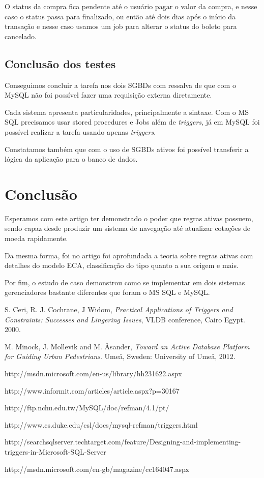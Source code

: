 \documentclass[conference]{IEEEtran}
\begin{document}
    O status da compra fica pendente até o usuário pagar o valor da compra, e nesse caso o status passa para finalizado, ou então até dois dias após o início da transação e nesse caso usamos um job para alterar o status do boleto para cancelado.

  \subsection{Conclusão dos testes}
  Conseguimos concluir a tarefa nos dois SGBDs com ressalva de que com o MySQL não foi possível fazer uma requisição externa diretamente.

	Cada sistema apresenta particularidades, principalmente a sintaxe. Com o MS SQL precisamos usar stored procedures e Jobs além de \textit{triggers}, já em MySQL foi possível realizar a tarefa usando apenas \textit{triggers}.

	Constatamos também que com o uso de SGBDs ativos foi possível transferir a lógica da aplicação para o banco de dados.

\section{Conclusão}
Esperamos com este artigo ter demonstrado o poder que regras ativas possuem, sendo capaz desde produzir um sistema de navegação até atualizar cotações de moeda rapidamente.

Da mesma forma, foi no artigo foi aprofundada a teoria sobre regras ativas com detalhes do modelo ECA, classificação do tipo quanto a sua origem e mais.

Por fim, o estudo de caso demonstrou como se implementar em dois sistemas gerenciadores bastante diferentes que foram o MS SQL e MySQL.

\begin{thebibliography}{1}

  S. Ceri, R. J. Cochrane, J Widom, \textit{Practical Applications of Triggers and Constraints: Successes and Lingering Issues}, VLDB conference, Cairo Egypt. 2000.

  M. Minock, J. Mollevik and M. \r{A}sander, \textit{Toward an Active Database Platform for Guiding Urban Pedestrians}. Ume\r{a}, Sweden: University of Ume\r{a}, 2012.

http://msdn.microsoft.com/en-us/library/hh231622.aspx
  
http://www.informit.com/articles/article.aspx?p=30167

  http://ftp.nchu.edu.tw/MySQL/doc/refman/4.1/pt/

  http://www.cs.duke.edu/csl/docs/mysql-refman/triggers.html

http://searchsqlserver.techtarget.com/feature/Designing-and-implementing-triggers-in-Microsoft-SQL-Server

http://msdn.microsoft.com/en-gb/magazine/cc164047.aspx


\end{thebibliography}
\end{document}

